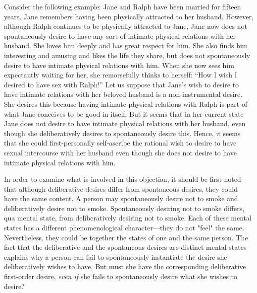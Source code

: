 \documentclass[output=paper,colorlinks,citecolor=brown
]{langscibook}
\begin{document}
Consider the following example: Jane and Ralph have been married for fifteen years. Jane remembers having been physically attracted to her husband. However, although Ralph continues to be physically attracted to Jane, Jane now does not spontaneously desire to have any sort of intimate physical relations with her husband. She loves him deeply and has great respect for him. She also finds him interesting and amusing and likes the life they share, but does not spontaneously desire to have intimate physical relations with him. When she now sees him expectantly waiting for her, she remorsefully thinks to herself: “How I wish I desired to have sex with Ralph!”        
Let us suppose that Jane's wish to desire to have intimate relations with her beloved husband is a non-instrumental desire. She desires this because having intimate physical relations with Ralph is part of what Jane conceives to be good in itself. But it seems that in her current state Jane does not desire to have intimate physical relations with her husband, even though she deliberatively desires to spontaneously desire this. Hence, it seems that she could first-personally self-ascribe the rational wish to desire to have sexual intercourse with her husband even though she does not desire to have intimate physical relations with him. 

In order to examine what is involved in this objection, it should be first noted that although deliberative desires differ from spontaneous desires, they could have the same content. A person may spontaneously desire not to smoke and deliberatively desire not to smoke. Spontaneously desiring not to smoke differs, qua mental state, from deliberatively desiring not to smoke. Each of these mental states has a different phenomenological character—they do not "feel" the same. Nevertheless, they could be together the states of one and the same person. The fact that the deliberative and the spontaneous desires are distinct mental states explains why a person can fail to spontaneously instantiate the desire she deliberatively wishes to have. But must she have the corresponding deliberative first-order desire, \textit{even if} she fails to spontaneously desire what she wishes to desire? 
\end{document}
